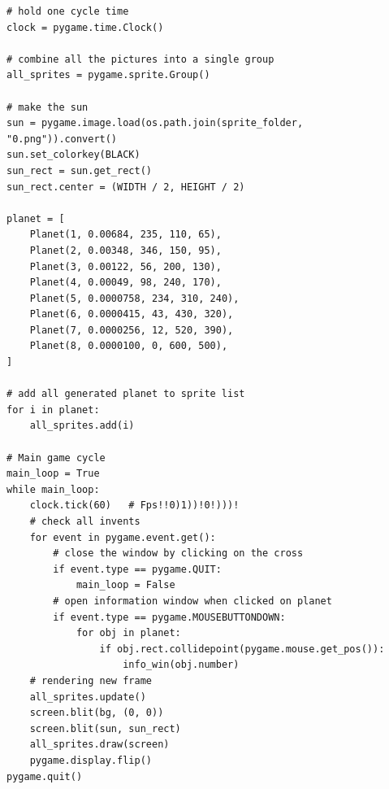 \documentclass[14pt, oneside]{altsu-report}
\begin{document}
{\begin{verbatim}
# hold one cycle time
clock = pygame.time.Clock()

# combine all the pictures into a single group
all_sprites = pygame.sprite.Group()

# make the sun
sun = pygame.image.load(os.path.join(sprite_folder, "0.png")).convert()
sun.set_colorkey(BLACK)
sun_rect = sun.get_rect()
sun_rect.center = (WIDTH / 2, HEIGHT / 2)

planet = [
    Planet(1, 0.00684, 235, 110, 65),
    Planet(2, 0.00348, 346, 150, 95),
    Planet(3, 0.00122, 56, 200, 130),
    Planet(4, 0.00049, 98, 240, 170),
    Planet(5, 0.0000758, 234, 310, 240),
    Planet(6, 0.0000415, 43, 430, 320),
    Planet(7, 0.0000256, 12, 520, 390),
    Planet(8, 0.0000100, 0, 600, 500),
]

# add all generated planet to sprite list
for i in planet:
    all_sprites.add(i)

# Main game cycle
main_loop = True
while main_loop:
    clock.tick(60)   # Fps!!0)1))!0!)))!
    # check all invents
    for event in pygame.event.get():
        # close the window by clicking on the cross
        if event.type == pygame.QUIT:
            main_loop = False
        # open information window when clicked on planet
        if event.type == pygame.MOUSEBUTTONDOWN:
            for obj in planet:
                if obj.rect.collidepoint(pygame.mouse.get_pos()):
                    info_win(obj.number)
    # rendering new frame
    all_sprites.update()
    screen.blit(bg, (0, 0))
    screen.blit(sun, sun_rect)
    all_sprites.draw(screen)
    pygame.display.flip()
pygame.quit()
\end{verbatim}
}
\end{document}

